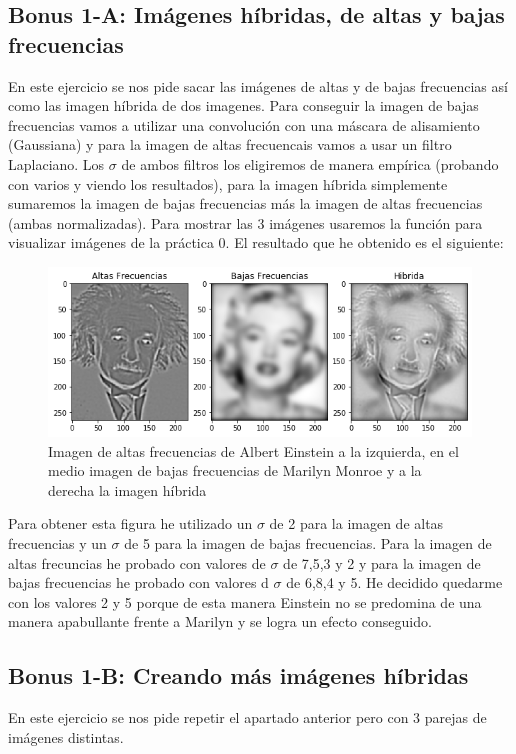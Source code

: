 \documentclass[12pt,spanish]{article}
\begin{document}
\subsection{Bonus 1-A: Imágenes híbridas, de altas y bajas frecuencias}
En este ejercicio se nos pide sacar las imágenes de altas y de bajas frecuencias así como las imagen híbrida de dos imagenes. Para conseguir la imagen de bajas frecuencias vamos a utilizar una convolución con una máscara de alisamiento (Gaussiana) y para la imagen de altas frecuencais vamos a usar un filtro Laplaciano. Los $\sigma$ de ambos filtros los eligiremos de manera empírica (probando con varios y viendo los resultados), para la imagen híbrida simplemente sumaremos la imagen de bajas frecuencias más la imagen de altas frecuencias (ambas normalizadas). Para mostrar las 3 imágenes usaremos la función para visualizar imágenes de la práctica 0. El resultado que he obtenido es el siguiente:

\begin{figure}[H]
	\includegraphics[width=\textwidth]{./imagenes_memoria/b1a.png}
	\caption{Imagen de altas frecuencias de Albert Einstein a la izquierda, en el medio imagen de bajas frecuencias de Marilyn Monroe y a la derecha la imagen híbrida}
	\label{bonus1a} 
\end{figure}

Para obtener esta figura he utilizado un $\sigma$ de 2 para la imagen de altas frecuencias y un $\sigma$ de 5 para la imagen de bajas frecuencias. Para la imagen de altas frecuncias he probado con valores de $\sigma$ de 7,5,3 y 2 y para la imagen de bajas frecuencias he probado con valores d $\sigma$ de 6,8,4 y 5. He decidido quedarme con los valores 2 y 5 porque de esta manera Einstein no se predomina de una manera apabullante frente a Marilyn y se logra un efecto conseguido.

\subsection{Bonus 1-B: Creando más imágenes híbridas}
En este ejercicio se nos pide repetir el apartado anterior pero con 3 parejas de imágenes distintas. \\
\end{document}
